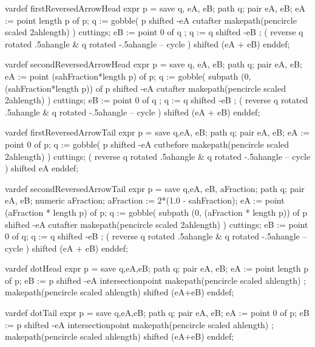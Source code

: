   
  vardef firstReversedArrowHead expr p =
    save q, eA, eB; path q; pair eA, eB;
    eA := point length p of p;
    q := gobble(
      p shifted -eA 
      cutafter makepath(pencircle scaled 2ahlength)
    ) cuttings;
    eB := point 0 of q ;
    q := q shifted -eB ;
    (
      reverse q rotated .5ahangle &
      q rotated -.5ahangle --
      cycle
    ) shifted (eA + eB)
  enddef;

  vardef secondReversedArrowHead expr p =
    save q, eA, eB; path q; pair eA, eB;
    eA := point (sahFraction*length p) of p;
    q := gobble(
      subpath (0, (sahFraction*length p)) of p shifted -eA 
      cutafter makepath(pencircle scaled 2ahlength)
    ) cuttings;
    eB := point 0 of q ;
    q := q shifted -eB ;
    (
      reverse q rotated .5ahangle &
      q rotated -.5ahangle --
      cycle
    ) shifted (eA + eB)
  enddef;

  vardef firstReversedArrowTail expr p =
    save q,eA, eB; path q; pair eA, eB;
    eA := point 0 of p;
    q := gobble(
      p shifted -eA
      cutbefore makepath(pencircle scaled 2ahlength)
    ) cuttings;
    (
      reverse q rotated .5ahangle &
      q rotated -.5ahangle --
      cycle
    ) shifted eA
  enddef;
  
  vardef secondReversedArrowTail expr p =
    save q,eA, eB, aFraction; path q;
    pair eA, eB; numeric aFraction;
    aFraction := 2*(1.0 - sahFraction);
    eA := point (aFraction * length p) of p;
    q := gobble(
      subpath (0, (aFraction * length p)) of p shifted -eA
      cutafter makepath(pencircle scaled 2ahlength)
    ) cuttings;
    eB := point 0 of q;
    q := q shifted -eB ;
    (
      reverse q rotated .5ahangle &
      q rotated -.5ahangle --
      cycle
    ) shifted (eA + eB)
  enddef;
  
  
  vardef dotHead expr p =
    save q,eA,eB; path q; pair eA, eB;
    eA := point length p of p;
    eB :=
      p shifted -eA
      intersectionpoint makepath(pencircle scaled ahlength) ;
    makepath(pencircle scaled ahlength) shifted (eA+eB)
  enddef;
  
  vardef dotTail expr p =
    save q,eA,eB; path q; pair eA, eB;
    eA := point 0 of p;
    eB :=
      p shifted -eA
      intersectionpoint makepath(pencircle scaled ahlength) ;
    makepath(pencircle scaled ahlength) shifted (eA+eB)
  enddef;

  
